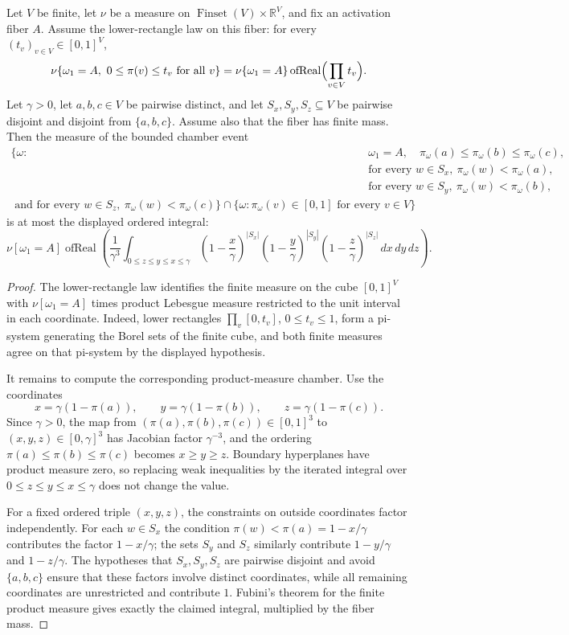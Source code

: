 \begin{helper}
Let \(V\) be finite, let \(\nu\) be a measure on
\(\operatorname{Finset}(V)\times\mathbb R^V\), and fix an activation fiber
\(A\).  Assume the lower-rectangle law on this fiber: for every
\((t_v)_{v\in V}\in[0,1]^V\),
\[
\nu\{\omega_1=A,\ 0\le \pi(v)\le t_v\text{ for all }v\}
=\nu\{\omega_1=A\}\operatorname{ofReal}\Bigl(\prod_{v\in V} t_v\Bigr).
\]
Let \(\gamma>0\), let \(a,b,c\in V\) be pairwise distinct, and let
\(S_x,S_y,S_z\subseteq V\) be pairwise disjoint and disjoint from
\(\{a,b,c\}\).  Assume also that the fiber has finite mass.  Then the
measure of the bounded chamber event
\[
\begin{aligned}
\{\omega:\;&\omega_1=A,\quad
  \pi_\omega(a)\le \pi_\omega(b)\le \pi_\omega(c),\\
&\text{for every }w\in S_x,\ \pi_\omega(w)<\pi_\omega(a),\\
&\text{for every }w\in S_y,\ \pi_\omega(w)<\pi_\omega(b),\\
  \text{ and for every }w\in S_z,\ \pi_\omega(w)<\pi_\omega(c)\}
  \cap \{\omega:\pi_\omega(v)\in[0,1]\text{ for every }v\in V\}
\end{aligned}
\]
is at most the displayed ordered integral:
\[
\nu[\omega_1=A]\operatorname{ofReal}\left(
\frac{1}{\gamma^3}
\int_{0\le z\le y\le x\le\gamma}
\left(1-\frac{x}{\gamma}\right)^{|S_x|}
\left(1-\frac{y}{\gamma}\right)^{|S_y|}
\left(1-\frac{z}{\gamma}\right)^{|S_z|}\,dx\,dy\,dz\right).
\]
\end{helper}
\begin{proof}
The lower-rectangle law identifies the finite measure on the cube
\([0,1]^V\) with \(\nu[\omega_1=A]\) times product Lebesgue measure restricted
to the unit interval in each coordinate.  Indeed, lower rectangles
\(\prod_v[0,t_v]\), \(0\le t_v\le 1\), form a pi-system generating the Borel
sets of the finite cube, and both finite measures agree on that pi-system by
the displayed hypothesis.

It remains to compute the corresponding product-measure chamber.  Use the
coordinates
\[
x=\gamma(1-\pi(a)),\qquad y=\gamma(1-\pi(b)),\qquad
z=\gamma(1-\pi(c)).
\]
Since \(\gamma>0\), the map from \((\pi(a),\pi(b),\pi(c))\in[0,1]^3\) to
\((x,y,z)\in[0,\gamma]^3\) has Jacobian factor \(\gamma^{-3}\), and the
ordering \(\pi(a)\le\pi(b)\le\pi(c)\) becomes \(x\ge y\ge z\).  Boundary
hyperplanes have product measure zero, so replacing weak inequalities by the
iterated integral over \(0\le z\le y\le x\le\gamma\) does not change the
value.

For a fixed ordered triple \((x,y,z)\), the constraints on outside
coordinates factor independently.  For each \(w\in S_x\) the condition
\(\pi(w)<\pi(a)=1-x/\gamma\) contributes the factor \(1-x/\gamma\); the sets
\(S_y\) and \(S_z\) similarly contribute \(1-y/\gamma\) and \(1-z/\gamma\).
The hypotheses that \(S_x,S_y,S_z\) are pairwise disjoint and avoid
\(\{a,b,c\}\) ensure that these factors involve distinct coordinates, while
all remaining coordinates are unrestricted and contribute \(1\).  Fubini's
theorem for the finite product measure gives exactly the claimed integral,
multiplied by the fiber mass.
\end{proof}
